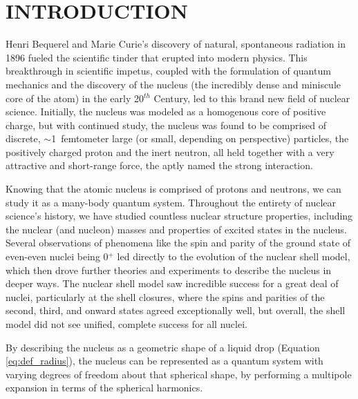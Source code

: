 %
%

\chapter{INTRODUCTION}
Henri Bequerel and Marie Curie's discovery of natural, spontaneous radiation in 1896 fueled the scientific tinder that erupted into modern physics. This breakthrough in scientific impetus, coupled with the formulation of quantum mechanics and the discovery of the nucleus (the incredibly dense and miniscule core of the atom) in the early 20$^{th}$ Century, led to this brand new field of nuclear science. Initially, the nucleus was modeled as a homogenous core of positive charge, but with continued study, the nucleus was found to be comprised of discrete, $\sim$1~femtometer large (or small, depending on perspective) particles, the positively charged proton and the inert neutron, all held together with a very attractive and short-range force, the aptly named the strong interaction.

\label{sec:Nuclei_quantum_system}
Knowing that the atomic nucleus is comprised of protons and neutrons, we can study it as a many-body quantum system. Throughout the entirety of nuclear science's history, we have studied countless nuclear structure properties, including the nuclear (and nucleon) masses and properties of excited states in the nucleus. Several observations of phenomena like the spin and parity of the ground state of even-even nuclei being 0$^+$ led directly to the evolution of the nuclear shell model, which then drove further theories and experiments to describe the nucleus in deeper ways. The nuclear shell model saw incredible success for a great deal of nuclei, particularly at the shell closures, where the spins and parities of the second, third, and onward states agreed exceptionally well, but overall, the shell model did not see unified, complete success for all nuclei. 



By describing the nucleus as a geometric shape of a liquid drop (Equation \ref{eq:def_radius}), the nucleus can be represented as a quantum system with varying degrees of freedom about that spherical shape, by performing a multipole expansion in terms of the spherical harmonics. %


